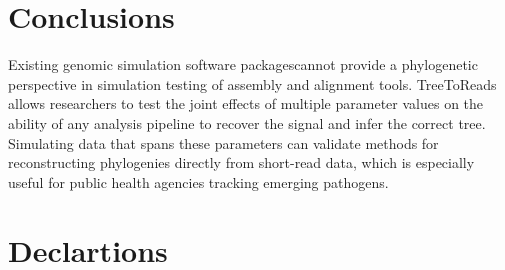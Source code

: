 \section*{Conclusions}
Existing genomic simulation software packagescannot provide a phylogenetic perspective in simulation testing of assembly and alignment tools.
TreeToReads allows researchers to test the joint effects of multiple parameter values on the ability of any analysis pipeline to recover the signal and infer the correct tree.
Simulating data that spans these parameters can validate methods for reconstructing phylogenies directly from short-read data, which is especially useful for public health agencies tracking emerging pathogens. 

\section*{Declartions}



